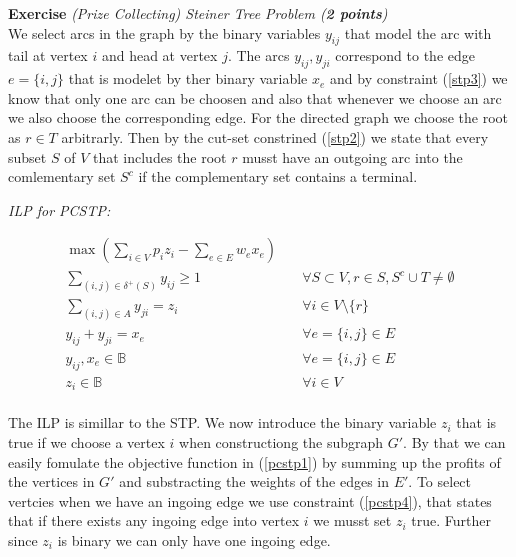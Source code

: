 \documentclass[a4paper,10pt]{article}
\newcounter{exc}
\newenvironment{exercise}[1]%
{\refstepcounter{exc}\textbf{Exercise \arabic{exc}} \emph{#1}\\}
{

\hrulefill\medskip}%
\newcommand{\Z}{\mathbb{Z}}
\begin{document}
\begin{exercise}{(Prize Collecting) Steiner Tree Problem (\textbf{2 points})}
  We select arcs in the graph by the binary variables $y_{ij}$ that model the arc with tail at vertex $i$ and head at vertex $j$. The arcs $y_{ij},y_{ji}$ correspond to the edge $e=\{i,j\}$ that is modelet by ther binary variable $x_e$ and by constraint (\ref{stp3}) we know that only one arc can be choosen and also that whenever we choose an arc we also choose the corresponding edge. For the directed graph we choose the root as $r\in T$ arbitrarly. Then by the cut-set constrined (\ref{stp2}) we state that every subset $S$ of $V$ that includes the root $r$ musst have an outgoing arc into the comlementary set $S^c$ if the complementary set contains a terminal. 


  \emph{ILP for PCSTP:}
  
  \begin{align}
    \label{pcstp1}
    \max\left( \sum\limits_{i\in V} p_i z_i -\sum\limits_{e\in E} w_e x_e \right) &  \\
    \label{pcstp2}
    \sum\limits_{(i,j)\in\delta^+(S)} y_{ij}\geq 1  &  \quad\forall S\subset V, r\in S, S^c \cup T \neq \emptyset  \\
    \label{pcstp3}
    \sum_{(i,j)\in A} y_{ji} =z_i & \quad \forall i\in V\setminus \{r\}\\
    \label{pcstp4}
    y_{ij}+y_{ji} = x_e & \quad \forall e=\{i,j\}\in E  \\
    \label{pcstp5}
    y_{ij}, x_e\in \mathbb{B}& \quad \forall  e=\{i,j\}\in E  \\
    \label{pcstp6}
    z_i\in \mathbb{B}& \quad \forall  i\in V  \\
  \end{align}

The ILP is simillar to the STP. We now introduce the binary variable $z_i$ that is true if we choose a vertex $i$ when constructiong the subgraph $G'$. By that we can easily fomulate the objective function in (\ref{pcstp1}) by summing up the profits of the vertices in $G'$ and substracting the weights of the edges in $E'$. To select vertcies when we have an ingoing edge we use constraint (\ref{pcstp4}), that states that if there exists any ingoing edge into vertex $i$ we musst set $z_i$ true. Further since $z_i$ is binary we can only have one ingoing edge.

\end{exercise}
%
%
%
\end{document}
